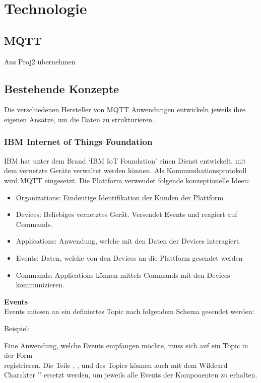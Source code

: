 \chapter{Technologie}
\label{chap:technologie}

\section{MQTT}
Aus Proj2 übernehmen


\section{Bestehende Konzepte}
Die verschiedenen Hersteller von MQTT Anwendungen entwickeln jeweils ihre eigenen Ansätze, um die Daten zu strukturieren. 


\subsection{IBM Internet of Things Foundation}

IBM hat unter dem Brand `IBM IoT Foundation' \cite{ibmIotF:home} einen Dienst entwickelt, mit dem vernetzte Geräte verwaltet werden können. Als Kommunikationsprotokoll wird MQTT eingesetzt. Die Plattform verwendet folgende konzeptionelle Ideen:
\begin{itemize}
    \item Organizations: Eindeutige Identifikation der Kunden der Plattform
	\item Devices: Beliebiges vernetztes Gerät. Versendet Events und reagiert auf Commands.
	\item Applications: Anwendung, welche mit den Daten der Devices interagiert.
	\item Events: Daten, welche von den Devices an die Plattform gesendet werden
	\item Commands: Applications können mittels Commands mit den Devices kommunizieren.
\end{itemize}

\textbf{Events} \\
Events müssen an ein definiertes Topic nach folgendem Schema gesendet werden: \\

Beispiel: 

Eine Anwendung, welche Events empfangen möchte, muss sich auf ein Topic in der Form \\
 registrieren.
Die Teile , ,  und  des Topics können auch mit dem Wildcard Charakter '\code{+}' ersetzt werden, um jeweils alle Events der Komponenten zu erhalten. 

